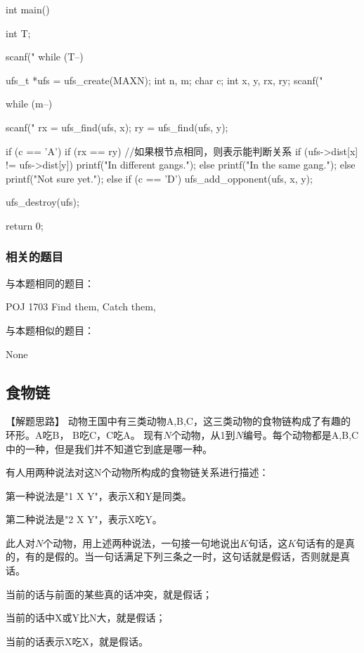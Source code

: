 \begin{Codex}[label=two_gangs.c]
int main() {
    int T;

    scanf("%
    while (T--) {
        ufs_t *ufs = ufs_create(MAXN);
        int n, m;
        char c;
        int x, y, rx, ry;
        scanf("%

        while (m--) {
            scanf("%
            rx = ufs_find(ufs, x);
            ry = ufs_find(ufs, y);

            if (c == 'A') {
                if (rx == ry) { //如果根节点相同，则表示能判断关系
                    if (ufs->dist[x] != ufs->dist[y])
                        printf("In different gangs.\n");
                    else
                        printf("In the same gang.\n");
                } else
                    printf("Not sure yet.\n");
            } else if (c == 'D') {
                ufs_add_opponent(ufs, x, y);
            }
        }
        ufs_destroy(ufs);
    }
    return 0;
}
\end{Codex}

\subsubsection{相关的题目}
与本题相同的题目：
\begindot
\item POJ 1703 Find them, Catch them, 
\myenddot

与本题相似的题目：
\begindot
\item  None
\myenddot


\subsection{食物链} %
【解题思路】
动物王国中有三类动物A,B,C，这三类动物的食物链构成了有趣的环形。A吃B， B吃C，C吃A。 现有$N$个动物，从1到$N$编号。每个动物都是A,B,C中的一种，但是我们并不知道它到底是哪一种。 

有人用两种说法对这N个动物所构成的食物链关系进行描述：
\begindot
\item 第一种说法是"1 X Y"，表示X和Y是同类。 
\item 第二种说法是"2 X Y"，表示X吃Y。 
\myenddot

此人对$N$个动物，用上述两种说法，一句接一句地说出$K$句话，这$K$句话有的是真的，有的是假的。当一句话满足下列三条之一时，这句话就是假话，否则就是真话。 
\begindot
\item 当前的话与前面的某些真的话冲突，就是假话； 
\item 当前的话中X或Y比N大，就是假话； 
\item 当前的话表示X吃X，就是假话。 
\myenddot

